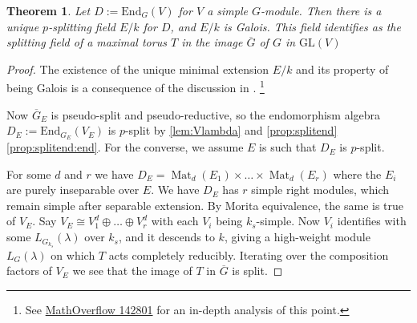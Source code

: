 \documentclass[11pt,reqno]{amsart}
\newtheorem{theorem}[lemma]{Theorem}
\theoremstyle{definition}
\theoremstyle{remark}
\theoremstyle{definition}
\theoremstyle{plain}
\DeclareMathOperator{\Mat}{Mat}
\newcommand{\GL}{\mathrm{GL}}
\newcommand{\End}{\mathrm{End}}
\newcommand{\barG}{{\overline{G}}}
\begin{document}
\begin{theorem}\label{thm:torussplit}
  Let $D:=\End_G(V)$ for $V$ a simple $G$-module. Then there is a unique $p$-splitting field $E/k$ for $D$, and $E/k$ is Galois. This field identifies as the splitting field of a maximal torus $T$ in the image $\barG$ of $G$ in $\GL(V)$
\end{theorem}
\begin{proof} The existence of the unique minimal extension $E/k$ and its property of being Galois is a consequence of the discussion in \cite[\S8.12]{Bor91}.
\footnote{See \href{https://mathoverflow.net/questions/142801/splitting-field-of-a-torus}{MathOverflow 142801} for an in-depth analysis of this point.}
  
  Now $\barG_E$ is pseudo-split and pseudo-reductive, so the endomorphism algebra $D_E:=\End_{G_E}(V_E)$ is $p$-split by \cref{lem:Vlambda} and \cref{prop:splitend}\cref{prop:splitend:end}. For the converse, we assume $E$ is such that $D_E$ is $p$-split. 
  
  For some $d$ and $r$ we have $D_E=\Mat_d(E_1)\times\dots\times \Mat_d(E_r)$ where the $E_i$ are purely inseparable over $E$. We have $D_E$ has $r$ simple right modules, which remain simple after separable extension. By Morita equivalence, the same is true of $V_E$. Say $V_E\cong V_1^d\oplus \dots\oplus V_r^d$ with each $V_i$ being $k_s$-simple. Now $V_i$ identifies with some $L_{G_{k_s}}(\lambda)$ over $k_s$, and it descends to $k$, giving a high-weight module $L_G(\lambda)$ on which $T$ acts completely reducibly. Iterating over the composition factors of $V_E$ we see that the image of $T$ in $\barG$ is split.  
\end{proof}
\end{document}
